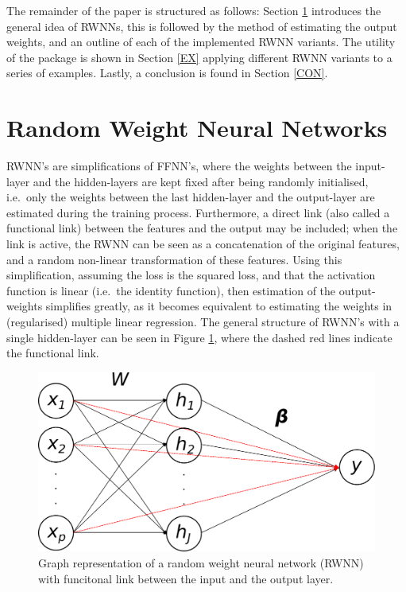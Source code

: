 \documentclass[
]{jss}
\begin{document}
The remainder of the paper is structured as follows: Section \ref{RWNN}
introduces the general idea of RWNNs, this is followed by the method of
estimating the output weights, and an outline of each of the implemented
RWNN variants. The utility of the  package is shown in Section
\ref{EX} applying different RWNN variants to a series of examples.
Lastly, a conclusion is found in Section \ref{CON}.

\hypertarget{RWNN}{%
\section{Random Weight Neural Networks}\label{RWNN}}

RWNN's are simplifications of FFNN's, where the weights between the
input-layer and the hidden-layers are kept fixed after being randomly
initialised, i.e.~only the weights between the last hidden-layer and the
output-layer are estimated during the training process. Furthermore, a
direct link (also called a functional link) between the features and the
output may be included; when the link is active, the RWNN can be seen as
a concatenation of the original features, and a random non-linear
transformation of these features. Using this simplification, assuming
the loss is the squared loss, and that the activation function is linear
(i.e.~the identity function), then estimation of the output-weights
simplifies greatly, as it becomes equivalent to estimating the weights
in (regularised) multiple linear regression. The general structure of
RWNN's with a single hidden-layer can be seen in Figure \ref{fig:rwnn},
where the dashed red lines indicate the functional link.

\begin{CodeChunk}
\begin{figure}[ht!]

{\centering \includegraphics[width=0.6\linewidth]{./Figures/RWNN} 

}

\caption[Graph representation of a random weight neural network (RWNN) with funcitonal link between the input and the output layer]{Graph representation of a random weight neural network (RWNN) with funcitonal link between the input and the output layer.}\label{fig:rwnn}
\end{figure}
\end{CodeChunk}
\end{document}
